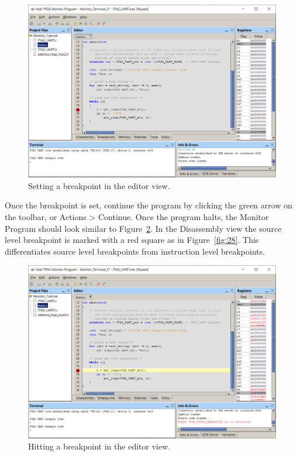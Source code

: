 \documentclass[11pt, twoside, pdftex]{article}
\begin{document}
\begin{figure}[h]
   \begin{center}
      \includegraphics[scale=0.5]{screenshots/figure26.png}
   \end{center}
   \caption{Setting a breakpoint in the editor view.}
	 \label{fig:26}
\end{figure}

Once the breakpoint is set, continue the program by clicking the green arrow on the toolbar, or {\sf Actions > Continue}.
Once the program halts, the Monitor Program should look similar to Figure~\ref{fig:27}. In the Disassembly view the source level breakpoint 
is marked with a red square as in Figure~\ref{fig:28}. This differentiates source level breakpoints from instruction level breakpoints.\\

\begin{figure}[h]
   \begin{center}
      \includegraphics[scale=0.5]{screenshots/figure27.png}
   \end{center}
   \caption{Hitting a breakpoint in the editor view.}
	 \label{fig:27}
\end{figure}
\end{document}
